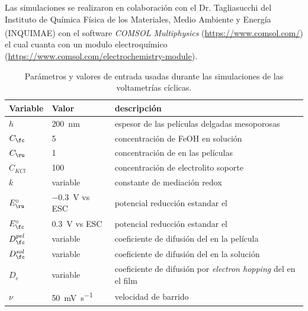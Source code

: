 	 	 Las simulaciones se realizaron en colaboración con el Dr. Tagliasucchi del Instituto de Química Física de los Materiales, Medio Ambiente y Energía (INQUIMAE) con el software \textit{COMSOL Multiphysics\textsuperscript\textregistered} (\url{https://www.comsol.com/}) el cual cuanta con un modulo electroquímico (\url{https://www.comsol.com/electrochemistry-module}).
	 			
			
	    	\begin{table}
	 	    \caption[Parámetros de las simulaciones]{Parámetros y valores de entrada usadas durante las simulaciones de las voltametrías cíclicas.}
	 	    \begin{tabular}{>{\raggedright\arraybackslash}m{1.4cm}>{\centering\arraybackslash}m{2.8cm}>{\raggedright\arraybackslash}m{6.7cm}} 
	 	    \toprule
	 	    Variable  & 	Valor  &   descripción      \\ \midrule
	 	    $h$  	  &  \hspace{-5mm} \SI{200}{nm}	& 	   espesor\index{espesor} de las películas delgadas mesoporosas 	    \\ \midrule
	 	    $C_{\fc}$  & \SI{5}{\milli\Molar}  & concentración de FeOH en solución    \\ \midrule
	 	    $C_{\ru}$ & \SI{1}{\milli\Molar}  & concentración de \ru\space en las películas    \\ \midrule
	 	    $C_{KCl}$ & \hspace{-5mm}  \SI{100}{\milli\Molar}  & concentración de electrolito soporte    \\ \midrule
	 	    $k$ 		   & variable 	 & 	constante de mediación\index{mediacion} redox    \\ \midrule
	 	    $E^\circ_{\ru}$  & \hspace{-3mm}\SI{-0.3}{\volt} vs ESC & potencial reducción estandar el \ru \\ \midrule
	 	    $E^\circ_{\fc}$  & \SI{0.3}{\volt} vs ESC & potencial reducción estandar el \fc \\ \midrule
	 	    $D_{\fc}^{pel} $  & variable & coeficiente de difusión\index{difusión} del \fc\space en la película \\ \midrule
	 	    $D_{\fc}^{sol} $  & variable & coeficiente de difusión\index{difusión} del \fc\space en la solución \\ \midrule
	 	    $D_{e}$  & variable & coeficiente de difusión\index{difusión} por \textit{electron hopping }del \ru\space en el film \\ \midrule
	 	    $\nu$    & \hspace{3.5mm} \SI{50}{\milli\volt\per\second}  &  velocidad de barrido\index{velocidad!de barrido} \\
	 	     \bottomrule
			\end{tabular}
			\label{tabla:simulacion}
			\end{table} 





